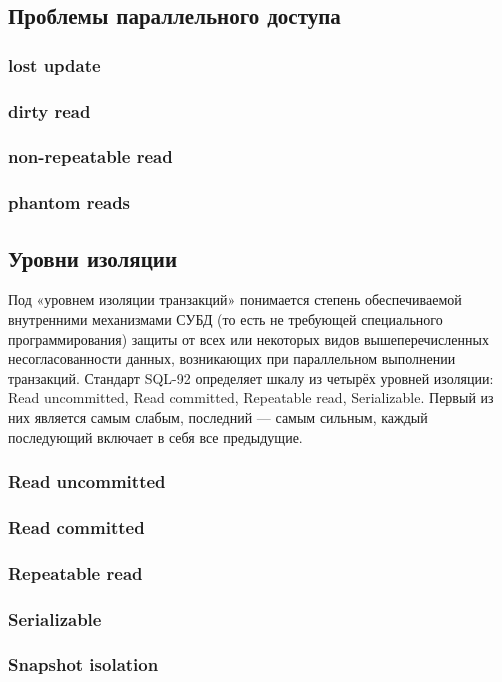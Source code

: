 \subsection{Проблемы параллельного доступа}
\subsubsection{lost update}
\subsubsection{dirty read}
\subsubsection{non-repeatable read}
\subsubsection{phantom reads}

\subsection{Уровни изоляции}
Под «уровнем изоляции транзакций» понимается степень обеспечиваемой внутренними механизмами СУБД (то есть не требующей специального программирования) защиты от всех или некоторых видов вышеперечисленных несогласованности данных, возникающих при параллельном выполнении транзакций. Стандарт SQL-92 определяет шкалу из четырёх уровней изоляции: Read uncommitted, Read committed, Repeatable read, Serializable. Первый из них является самым слабым, последний — самым сильным, каждый последующий включает в себя все предыдущие. 

\subsubsection{Read uncommitted}
\subsubsection{Read committed}
\subsubsection{Repeatable read}
\subsubsection{Serializable}
\subsubsection{Snapshot isolation}

